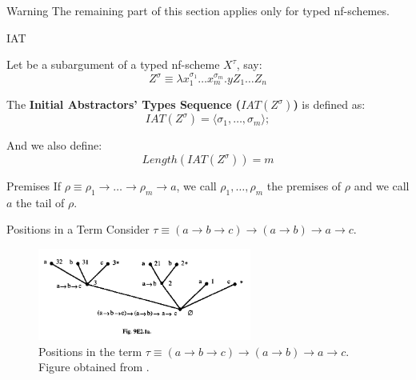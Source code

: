 \begin{frame}{Warning}
The remaining part of this section applies only for typed nf-schemes. 
\end{frame}

\begin{frame}{IAT}
\begin{mydef}[IAT]
Let  be a subargument of a typed nf-scheme $X^\tau$, say: 
\begin{equation*}
    Z^{\sigma} \equiv \lambda x_{1}^{\sigma_1}
    \ldots x_{m}^{\sigma_m}.y Z_1 \ldots Z_n     \tag{$m \geq 0, n \geq 0$}
\end{equation*}

The \textbf{Initial Abstractors' Types Sequence ($IAT(Z^\sigma)$)} is defined as: 
\begin{equation*}
    IAT(Z^{\sigma}) = \langle \sigma_1, \ldots, \sigma_m \rangle; 
\end{equation*}

And we also define:
\begin{equation*}
    Length(IAT(Z^\sigma)) = m
\end{equation*} 
\end{mydef}
\end{frame}

\begin{frame}{Premises}
    If $\rho \equiv \rho_1 \rightarrow \ldots \rightarrow \rho_m \rightarrow a$, we call $\rho_1, \ldots, \rho_m$ the premises of $\rho$ and we call $a$ the tail of $\rho$.
\end{frame}

\begin{frame}{Positions in a Term}
Consider $\tau \equiv (a \rightarrow b \rightarrow c) \rightarrow (a \rightarrow b) \rightarrow a \rightarrow c$. 
\begin{figure}
    \centering
    \includegraphics[width=7cm]{subpremise.png}
    \caption{Positions in the term $\tau \equiv (a \rightarrow b \rightarrow c) \rightarrow (a \rightarrow b) \rightarrow a \rightarrow c$.
    Figure obtained from \cite{hindley}.}
    \label{subpremise1}
\end{figure}
\end{frame}

